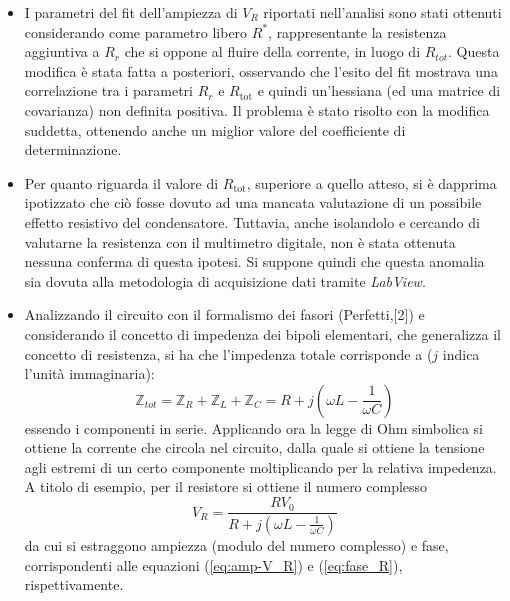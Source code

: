 
\begin{itemize}
    \item I parametri del fit dell'ampiezza di $V_R$ riportati nell'analisi sono stati ottenuti considerando come parametro libero
    $R^*$, rappresentante la resistenza aggiuntiva a $R_r$ che si oppone al fluire della
    corrente, in luogo di $R_{tot}$.
    Questa modifica è stata fatta a posteriori, osservando che l'esito del fit mostrava una
    correlazione tra i parametri $R_r$ e $R_{\text{tot}}$ e quindi un'hessiana (ed una matrice di covarianza) non definita
    positiva.
    Il problema è stato risolto con la modifica suddetta, ottenendo anche un miglior valore del coefficiente
    di determinazione.
    \item Per quanto riguarda il valore di $R_{\text{tot}}$, superiore a quello atteso, si è dapprima ipotizzato
    che ciò fosse dovuto ad una mancata valutazione di un possibile effetto resistivo del condensatore.
    Tuttavia, anche isolandolo e cercando di valutarne la resistenza con il multimetro digitale, non è stata ottenuta
    nessuna conferma di questa ipotesi.
    Si suppone quindi che questa anomalia sia dovuta alla metodologia di acquisizione dati tramite \emph{LabView}.
    \item Analizzando il circuito con il formalismo dei fasori (Perfetti,[2]) e considerando il concetto di impedenza dei bipoli elementari, che
    generalizza il concetto di resistenza, si ha che l'impedenza totale corrisponde a ($j$ indica l'unità immaginaria):
    \[
        \mathbb{Z}_{tot} = \mathbb{Z}_R + \mathbb{Z}_L + \mathbb{Z}_C = R + j \left( \omega L - \frac{1}{\omega C} \right)
    \]
    essendo i componenti in serie. Applicando ora la legge di Ohm simbolica si ottiene la corrente che circola nel circuito,
    dalla quale si ottiene la tensione agli estremi di un certo componente moltiplicando per la relativa impedenza.
    A titolo di esempio, per il resistore si ottiene il numero complesso
    \[
        V_R = \frac{R V_0}{ R + j \left( \omega L - \frac{1}{\omega C} \right)}
    \]
    da cui si estraggono ampiezza (modulo del numero complesso) e fase, corrispondenti alle equazioni  (\ref{eq:amp-V_R})
    e (\ref{eq:fase_R}),
    rispettivamente.
\end{itemize}








